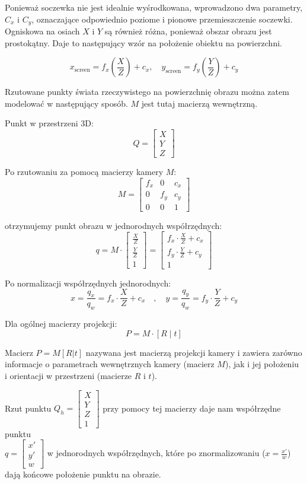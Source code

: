 \documentclass[magisterska]{pracadypl}
\begin{document}
Ponieważ soczewka nie jest idealnie wyśrodkowana, wprowadzono dwa parametry, $C_x$ i $C_y$, oznaczające odpowiednio poziome i pionowe przemieszczenie soczewki.
Ogniskowa na osiach $X$ i $Y$ są również różna, ponieważ obszar obrazu jest prostokątny. Daje to następujący wzór na położenie obiektu na powierzchni.

\[
x_{\text{screen}} = f_x \left( \frac{X}{Z} \right) + c_x, \quad
y_{\text{screen}} = f_y \left( \frac{Y}{Z} \right) + c_y
\]

Rzutowane punkty świata rzeczywistego na powierzchnię obrazu można zatem modelować w następujący sposób. $M$ jest tutaj macierzą wewnętrzną.

\bigskip

Punkt w przestrzeni 3D:
\[
Q = \begin{bmatrix} X \\ Y \\ Z \end{bmatrix}
\]

Po rzutowaniu za pomocą macierzy kamery $M$:
\[
M = \begin{bmatrix}
f_x & 0 & c_x \\
0 & f_y & c_y \\
0 & 0 & 1
\end{bmatrix}
\]

otrzymujemy punkt obrazu w jednorodnych współrzędnych:
\[
q = M \cdot \begin{bmatrix}
\frac{X}{Z} \\
\frac{Y}{Z} \\
1
\end{bmatrix}
=
\begin{bmatrix}
f_x \cdot \frac{X}{Z} + c_x \\
f_y \cdot \frac{Y}{Z} + c_y \\
1
\end{bmatrix}
\]

Po normalizacji współrzędnych jednorodnych:
\[
x = \frac{q_x}{q_w} = f_x \cdot \frac{X}{Z} + c_x
\quad , \quad
y = \frac{q_y}{q_w} = f_y \cdot \frac{Y}{Z} + c_y
\]

Dla ogólnej macierzy projekcji:
\[
P = M \cdot [R \;|\; t]
\]

Macierz \( P = M[R | t] \) nazywana jest macierzą projekcji kamery i zawiera zarówno informacje o parametrach wewnętrznych kamery (macierz \( M \)), jak i jej położeniu i orientacji w przestrzeni (macierze \( R \) i \( t \)).

Rzut punktu \( Q_h = \begin{bmatrix} X \\ Y \\ Z \\ 1 \end{bmatrix} \) przy pomocy tej macierzy daje nam współrzędne punktu\\ \( q = \begin{bmatrix} x' \\ y' \\ w \end{bmatrix} \) w jednorodnych współrzędnych, które po znormalizowaniu (\( x = \frac{x'}{w} \)) dają końcowe położenie punktu na obrazie.
\end{document}
